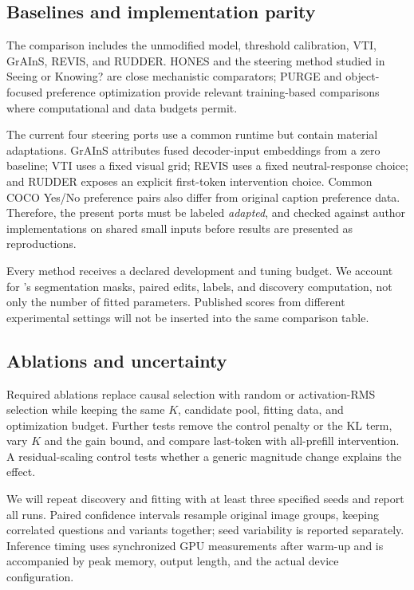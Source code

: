 \subsection{Baselines and implementation parity}
The comparison includes the unmodified model, threshold calibration,
VTI, GrAInS, REVIS, and RUDDER. HONES and the steering method studied in
Seeing or Knowing? are close mechanistic comparators; PURGE and
object-focused preference optimization provide relevant training-based
comparisons where computational and data budgets permit.

The current four steering ports use a common runtime but contain material
adaptations. GrAInS attributes fused decoder-input embeddings from a zero
baseline; VTI uses a fixed visual grid; REVIS uses a fixed neutral-response
choice; and RUDDER exposes an explicit first-token intervention choice.
Common COCO Yes/No preference pairs also differ from original caption
preference data. Therefore, the present ports must be labeled
\emph{adapted}, and checked against author implementations on shared small
inputs before results are presented as reproductions.

Every method receives a declared development and tuning budget. We account
for \method's segmentation masks, paired edits, labels, and discovery
computation, not only the number of fitted parameters. Published scores
from different experimental settings will not be inserted into the same
comparison table.

\subsection{Ablations and uncertainty}
Required ablations replace causal selection with random or activation-RMS
selection while keeping the same $K$, candidate pool, fitting data, and
optimization budget. Further tests remove the control penalty or the KL
term, vary $K$ and the gain bound, and compare last-token with all-prefill
intervention. A residual-scaling control tests whether a generic magnitude
change explains the effect.

We will repeat discovery and fitting with at least three specified seeds
and report all runs. Paired confidence intervals resample original image
groups, keeping correlated questions and variants together; seed
variability is reported separately. Inference timing uses synchronized GPU
measurements after warm-up and is accompanied by peak memory, output
length, and the actual device configuration.
